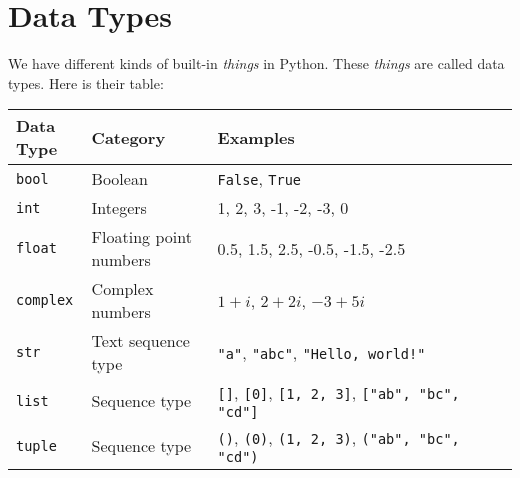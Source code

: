 
\section{Data Types}

We have different kinds of built-in \textit{things} in Python. These \textit{things} are called data
types.
\newline
Here is their table:

\begin{table}[H]
    \begin{tabular}{p{0.15\linewidth}p{0.25\linewidth}p{0.60\linewidth}}
        \toprule
        \textbf{Data Type} & \textbf{Category} & \textbf{Examples}\\
        \midrule

        \texttt{bool} & Boolean & \texttt{False}, \texttt{True}\\
        \midrule

        \texttt{int} & Integers & 1, 2, 3, -1, -2, -3, 0\\
        \midrule

        \texttt{float} & Floating point numbers & 0.5, 1.5, 2.5, -0.5, -1.5, -2.5\\
        \midrule

        \texttt{complex} & Complex numbers & \(1 + i\), \(2 + 2i\), \(-3 + 5i\)\\
        \midrule

        \texttt{str} & Text sequence type & \texttt{"a"},
                                                        \texttt{"abc"},
                                                        \texttt{"Hello, world!"}\\
        \midrule

        \texttt{list} & Sequence type & \texttt{[]},
                                                    \texttt{[0]},
                                                    \texttt{[1, 2, 3]},
                                                    \texttt{["ab", "bc", "cd"]}\\
        \midrule

        \texttt{tuple} & Sequence type & \texttt{()},
                                                     \texttt{(0)},
                                                     \texttt{(1, 2, 3)},
                                                     \texttt{("ab", "bc", "cd")}\\
        \midrule


\end{tabular}
\end{table}
